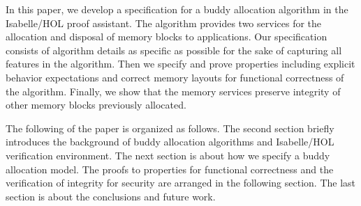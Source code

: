 In this paper, we develop a specification for a buddy allocation algorithm in the Isabelle/HOL proof assistant. The algorithm provides two services for the allocation and disposal of memory blocks to applications. Our specification consists of algorithm details as specific as possible for the sake of capturing all features in the algorithm. Then we specify and prove properties including explicit behavior expectations and correct memory layouts for functional correctness of the algorithm. Finally, we show that the memory services preserve integrity of other memory blocks previously allocated.

The following of the paper is organized as follows. The second section briefly introduces the background of buddy allocation algorithms and Isabelle/HOL verification environment. The next section is about how we specify a buddy allocation model. The proofs to properties for functional correctness and the verification of integrity for security are arranged in the following section. The last section is about the conclusions and future work.
